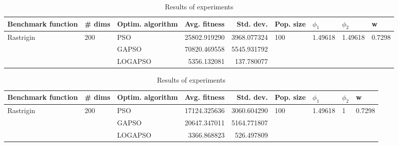 \documentclass{article}
\begin{document}
\begin{table}
\centering
\caption{Results of experiments}
\begin{tabular}{lllrrllll}
\toprule
        Benchmark function &              \# dims & Optim. algorithm &  Avg. fitness &   Std. dev. &            Pop. size &               $\phi_{1}$ &               $\phi_{2}$ &                       w \\
\midrule
\multirow{3}{*}{Rastrigin} & \multirow{3}{*}{200} &              PSO &  25802.919290 & 3968.077324 & \multirow{3}{*}{100} & \multirow{3}{*}{1.49618} & \multirow{3}{*}{1.49618} & \multirow{3}{*}{0.7298} \\
                           &                      &            GAPSO &  70820.469558 & 5545.931792 &                      &                          &                          &                         \\
                           &                      &          LOGAPSO &   5356.132081 &  137.780077 &                      &                          &                          &                         \\
\bottomrule
\end{tabular}
\end{table}
\begin{table}
\centering
\caption{Results of experiments}
\begin{tabular}{lllrrllll}
\toprule
        Benchmark function &              \# dims & Optim. algorithm &  Avg. fitness &   Std. dev. &            Pop. size &               $\phi_{1}$ &         $\phi_{2}$ &                       w \\
\midrule
\multirow{3}{*}{Rastrigin} & \multirow{3}{*}{200} &              PSO &  17124.325636 & 3060.604290 & \multirow{3}{*}{100} & \multirow{3}{*}{1.49618} & \multirow{3}{*}{1} & \multirow{3}{*}{0.7298} \\
                           &                      &            GAPSO &  20647.347011 & 5164.771807 &                      &                          &                    &                         \\
                           &                      &          LOGAPSO &   3366.868823 &  526.497809 &                      &                          &                    &                         \\
\bottomrule
\end{tabular}
\end{table}
\end{document}
